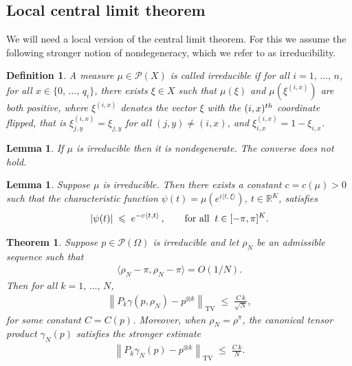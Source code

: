 \documentclass[10pt,a4paper]{article}
\newtheorem{theo}[theorem]{Theorem}
\newtheorem{lemm}[theorem]{Lemma}
\newtheorem{defi}[theorem]{Definition}
\renewcommand{\leq}{\;\leqslant\;}
\newcommand{\rhoN}{\rho^{\pi}}
\newcommand{\scalar}[2]{\langle #1, #2\rangle}
\newcommand{\tv}{\mathrm{TV}}
\newcommand{\cP}{\mathcal{P}}
\newcommand{\bbR}{\mathbb{R}}
\let\g=\gamma
\let\r=\rho
\let\O=\Omega
\begin{document}
\subsection{Local central limit theorem}

We will need a local version of the central limit theorem. For this we assume the following stronger notion of nondegeneracy, which we refer to as irreducibility.

\begin{defi}\label{def:irr}
A measure $\mu\in\cP(X)$ is called \emph{irreducible} if for all $i=1,\,\dots, \,n$, for all $x\in\{0,\,\dots,\,q_i\}$, there exists $\xi\in X$ such that $\mu(\xi)$ and $\mu(\xi^{(i,x)})$ are both positive, where $\xi^{(i,x)}$ denotes the vector $\xi$ with the $(i,x)^{\rm th}$ coordinate flipped, that is $\xi^{(i,x)}_{j,y}=\xi_{j,y}$ for all $(j,y)\neq (i,x)$, and $\xi^{(i,x)}_{i,x}=1-\xi_{i,x}$.
\end{defi}

\begin{lemm}\label{lem:nondeg}
If $\mu$ is irreducible then it is nondegenerate. The converse does not hold.
\end{lemm}

\begin{lemm}\label{charfunc}
Suppose $\mu$ is irreducible. Then there exists a constant $c=c(\mu)>0$ such that the characteristic function $\psi(t)=\mu(e^{i\scalar{t}{\xi}})$, $t\in\bbR^K$, satisfies
\begin{align*}
|\psi(t)|\leq e^{-c
\scalar{t}{t} }\,,\qquad \text{for all\;\;} t\in[-\pi,\pi]^K.
\end{align*}
\end{lemm}

\begin{theo}\label{th:eqens}
Suppose $p\in\cP(\O)$ is irreducible and let $\r_N$ be an admissible sequence such that
\begin{align}\label{hypo10}
\scalar{\r_N-\pi}{\r_N-\pi} =O(1/N).
\end{align}
Then for all $k=1,\,\dots,\,N$,
\begin{align}\label{eq:chaos00}
\left\|P_k\g(p,\r_N)-p^{\otimes k}\right\|_\tv \leq \frac{C\,k}{\sqrt N},
\end{align}
for some constant $C=C(p)$. Moreover, when $\r_N=\rhoN$, the canonical tensor product $\g_N(p)$ satisfies the stronger estimate
\begin{align}\label{eq:chaos000}
\left\|P_k\g_N(p)-p^{\otimes k}\right\|_\tv \leq \frac{C\,k}{ N}.
\end{align}
\end{theo}
\end{document}
